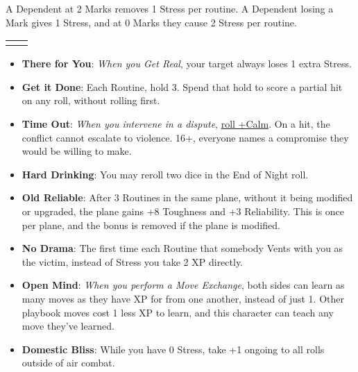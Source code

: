 \documentclass[twoside,headings,a4paper]{article}
\begin{document}
{\begin{itemize}
              A Dependent at 2 Marks removes 1 Stress per routine. A Dependent losing a Mark gives
              1 Stress, and at 0 Marks they cause 2 Stress per routine.
    \end{itemize}
    \begin{NiceTabular}{XX}
         &
    \end{NiceTabular}
    \PlaybookRuleR
    \begin{itemize}
        \renewcommand{\labelitemi}{{\large\circ}}
        \item \textbf{There for You}: \textit{When you Get Real}, your target always loses 1 extra Stress.
        \item \textbf{Get it Done}: Each Routine, hold 3. Spend that hold to score a partial hit on any roll,
              without rolling first.
        \item \textbf{Time Out}: \textit{When you intervene in a dispute}, \underline{roll +Calm}. On a hit, the conflict cannot
              escalate to violence. 16+, everyone names a compromise they would be willing to make.
        \item \textbf{Hard Drinking}: You may reroll two dice in the End of Night roll.
        \item \textbf{Old Reliable}: After 3 Routines in the same plane, without it being modified or upgraded,
              the plane gains +8 Toughness and +3 Reliability. This is once per plane, and the bonus is
              removed if the plane is modified.
        \item \textbf{No Drama}: The first time each Routine that somebody Vents with you as the victim,
              instead of Stress you take 2 XP directly.
        \item \textbf{Open Mind}: \textit{When you perform a Move Exchange}, both sides can learn as many moves
              as they have XP for from one another, instead of just 1. Other playbook moves cost 1 less
              XP to learn, and this character can teach any move they’ve learned.
        \item \textbf{Domestic Bliss}: While you have 0 Stress, take +1 ongoing to all rolls outside of air combat.
    \end{itemize}
    \PlaybookRuleR

}
\end{document}
